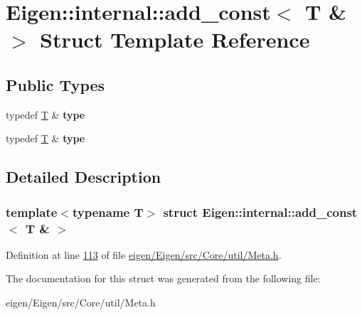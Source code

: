 \hypertarget{struct_eigen_1_1internal_1_1add__const_3_01_t_01_6_01_4}{}\section{Eigen\+:\+:internal\+:\+:add\+\_\+const$<$ T \& $>$ Struct Template Reference}
\label{struct_eigen_1_1internal_1_1add__const_3_01_t_01_6_01_4}
\subsection*{Public Types}
\begin{DoxyCompactItemize}
\item 
\mbox{\label{struct_eigen_1_1internal_1_1add__const_3_01_t_01_6_01_4_aaf6bf259eadbe000056c6b33d1ef7d0b}} 
typedef \hyperlink{group___sparse_core___module}{T} \& {\bfseries type}
\item 
\mbox{\label{struct_eigen_1_1internal_1_1add__const_3_01_t_01_6_01_4_aaf6bf259eadbe000056c6b33d1ef7d0b}} 
typedef \hyperlink{group___sparse_core___module}{T} \& {\bfseries type}
\end{DoxyCompactItemize}


\subsection{Detailed Description}
\subsubsection*{template$<$typename T$>$\newline
struct Eigen\+::internal\+::add\+\_\+const$<$ T \& $>$}



Definition at line \hyperlink{eigen_2_eigen_2src_2_core_2util_2_meta_8h_source_l00113}{113} of file \hyperlink{eigen_2_eigen_2src_2_core_2util_2_meta_8h_source}{eigen/\+Eigen/src/\+Core/util/\+Meta.\+h}.



The documentation for this struct was generated from the following file\+:\begin{DoxyCompactItemize}
\item 
eigen/\+Eigen/src/\+Core/util/\+Meta.\+h\end{DoxyCompactItemize}
